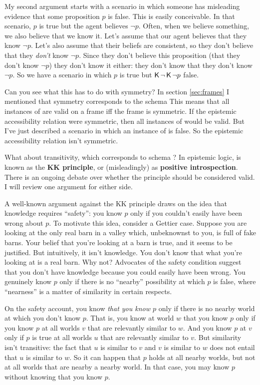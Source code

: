 My second argument starts with a scenario in which someone has misleading
evidence that some proposition $p$ is false. This is easily conceivable. In that
scenario, $p$ is true but the agent believes $\neg p$. Often, when we believe
something, we also believe that we know it. Let's assume that our agent believes
that they know $\neg p$. Let's also assume that their beliefs are consistent, so
they don't believe that they \emph{don't} know $\neg p$. Since they don't
believe this proposition (that they don't know $\neg p$) they don't know it
either: they don't know that they don't know $\neg p$. So we have a scenario in
which $p$ is true but $\operatorname{\mathsf{K}{}} \neg \operatorname{\mathsf{K}{}} \neg p$ false.

Can you see what this has to do with symmetry? In section \ref{sec:frames} I
mentioned that symmetry corresponds to the schema
%
%
This means that all instances of  are valid on a frame iff the frame is
symmetric. If the epistemic accessibility relation were symmetric, then all
instances of  would be valid. But I've just described a scenario in which
an instance of  is false. So the epistemic accessibility relation isn't
symmetric.

What about transitivity, which corresponds to schema ?
%
%
In epistemic logic,  is known as the \textbf{KK principle}, or
(misleadingly) as \textbf{positive introspection}. There is an ongoing debate
over whether the principle should be considered valid. I will review one
argument for either side.

A well-known argument against the KK principle draws on the idea that knowledge
requires ``safety'': you know $p$ only if you couldn't easily have been wrong
about $p$. To motivate this idea, consider a Gettier case. Suppose you are
looking at the only real barn in a valley which, unbeknownst to you, is full of
fake barns. Your belief that you're looking at a barn is true, and it seems to
be justified. But intuitively, it isn't knowledge. You don't know that what
you're looking at is a real barn. Why not? Advocates of the safety condition
suggest that you don't have knowledge because you could easily have been wrong.
You genuinely know $p$ only if there is no ``nearby'' possibility at which $p$
is false, where ``nearness'' is a matter of similarity in certain respects.

On the safety account, you know \emph{that you know $p$} only if there is no
nearby world at which you don't know $p$. That is, you know at world $w$ that
you know $p$ only if you know $p$ at all worlds $v$ that are relevantly similar
to $w$. And you know $p$ at $v$ only if $p$ is true at all worlds $u$ that are
relevantly similar to $v$. But similarity isn't transitive: the fact that $u$ is
similar to $v$ and $v$ is similar to $w$ does not entail that $u$ is similar to
$w$. So it can happen that $p$ holds at all nearby worlds, but not at all worlds
that are nearby a nearby world. In that case, you may know $p$ without knowing
that you know $p$.

